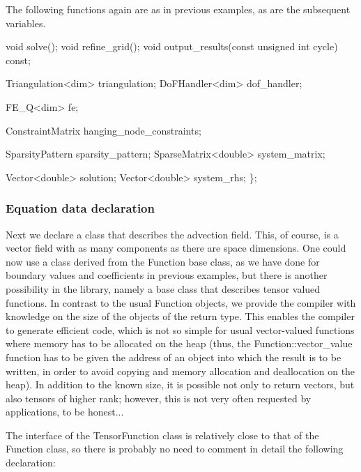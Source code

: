 The following functions again are as in previous examples, as are the subsequent variables.


\begin{DoxyCode}
    \textcolor{keywordtype}{void} solve();
    \textcolor{keywordtype}{void} refine\_grid();
    \textcolor{keywordtype}{void} output\_results(\textcolor{keyword}{const} \textcolor{keywordtype}{unsigned} \textcolor{keywordtype}{int} cycle) \textcolor{keyword}{const};

    Triangulation<dim> triangulation;
    DoFHandler<dim> dof\_handler;

    FE\_Q<dim> fe;

    ConstraintMatrix hanging\_node\_constraints;

    SparsityPattern sparsity\_pattern;
    SparseMatrix<double> system\_matrix;

    Vector<double> solution;
    Vector<double> system\_rhs;
\};
\end{DoxyCode}


\label{_Equationdatadeclaration}%
 \subsubsection*{Equation data declaration}

Next we declare a class that describes the advection field. This, of course, is a vector field with as many components as there are space dimensions. One could now use a class derived from the {\ttfamily Function} base class, as we have done for boundary values and coefficients in previous examples, but there is another possibility in the library, namely a base class that describes tensor valued functions. In contrast to the usual {\ttfamily Function} objects, we provide the compiler with knowledge on the size of the objects of the return type. This enables the compiler to generate efficient code, which is not so simple for usual vector-\/valued functions where memory has to be allocated on the heap (thus, the {\ttfamily Function\+::vector\+\_\+value} function has to be given the address of an object into which the result is to be written, in order to avoid copying and memory allocation and deallocation on the heap). In addition to the known size, it is possible not only to return vectors, but also tensors of higher rank; however, this is not very often requested by applications, to be honest...

The interface of the {\ttfamily Tensor\+Function} class is relatively close to that of the {\ttfamily Function} class, so there is probably no need to comment in detail the following declaration\+:


